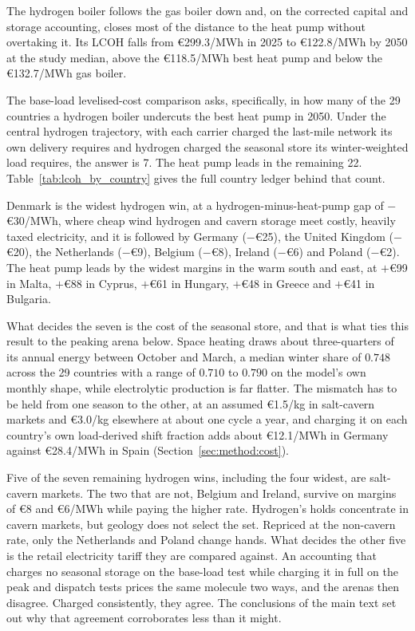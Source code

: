 The hydrogen boiler follows the gas boiler down and, on the corrected capital and storage accounting,
closes most of the distance to the heat pump without overtaking it. Its LCOH falls from
\euro{}299.3/MWh in 2025 to \euro{}122.8/MWh by 2050
at the study median, above the \euro{}118.5/MWh best heat pump and below the
\euro{}132.7/MWh gas boiler.

The base-load levelised-cost comparison asks, specifically, in how many of the 29
countries a hydrogen boiler undercuts the best heat pump in 2050. Under the central
hydrogen trajectory, with each carrier charged the last-mile network its own delivery
requires and hydrogen charged the seasonal store its winter-weighted load requires, the
answer is 7. The heat pump leads in the remaining 22.
Table~\ref{tab:lcoh_by_country} gives the full country ledger behind that count.



Denmark is the widest hydrogen win, at a hydrogen-minus-heat-pump gap of $-$\euro{}30/MWh, where cheap
wind hydrogen and cavern storage meet costly, heavily taxed electricity, and it is
followed by Germany ($-$\euro{}25), the United Kingdom ($-$\euro{}20), the Netherlands
($-$\euro{}9), Belgium ($-$\euro{}8), Ireland ($-$\euro{}6) and Poland
($-$\euro{}2). The heat pump leads by the widest margins in the warm south and east,
at $+$\euro{}99 in Malta, $+$\euro{}88 in Cyprus, $+$\euro{}61 in Hungary,
$+$\euro{}48 in Greece and $+$\euro{}41 in Bulgaria.

What decides the seven is the cost of the seasonal store, and that is what ties this
result to the peaking arena below. Space heating draws about three-quarters of its
annual energy between October and March, a median winter share of $0.748$ across the 29
countries with a range of $0.710$ to $0.790$ on the model's own monthly shape, while
electrolytic production is far flatter. The mismatch has to be held from one season to
the other, at an assumed \euro{}1.5/kg in salt-cavern markets and \euro{}3.0/kg
elsewhere at about one cycle a year, and charging it on each country's own load-derived
shift fraction adds about \euro{}12.1/MWh in Germany against \euro{}28.4/MWh in Spain
(Section~\ref{sec:method:cost}).

Five of the seven remaining hydrogen wins, including the four widest, are salt-cavern
markets. The two that are not, Belgium and Ireland, survive on margins of \euro{}8 and
\euro{}6/MWh while paying the higher rate. Hydrogen's holds concentrate in cavern markets, but geology does not select the set. Repriced at the non-cavern rate, only the Netherlands and Poland change hands. What
decides the other five is the retail electricity tariff they are compared against. An accounting that charges no seasonal
storage on the base-load test while charging it in full on the peak and dispatch tests
prices the same molecule two ways, and the arenas then disagree. Charged
consistently, they agree. The conclusions of the main text set out why that agreement corroborates less than it
might.

